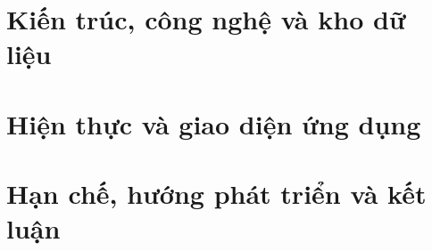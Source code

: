 \documentclass[a4paper,12pt]{article}
\begin{document}
\hypersetup{pageanchor=false}

\hypersetup{pageanchor=true}

\tableofcontents
\clearpage
\listoffigures
\listoftables
\clearpage




\clearpage



\section{Kiến trúc, công nghệ và kho dữ liệu}
\label{sec:solution}



\section{Hiện thực và giao diện ứng dụng}
\label{sec:application}



\clearpage


\section{Hạn chế, hướng phát triển và kết luận}
\label{sec:closing}



\clearpage
{}
{}



\clearpage
\appendix


\end{document}
